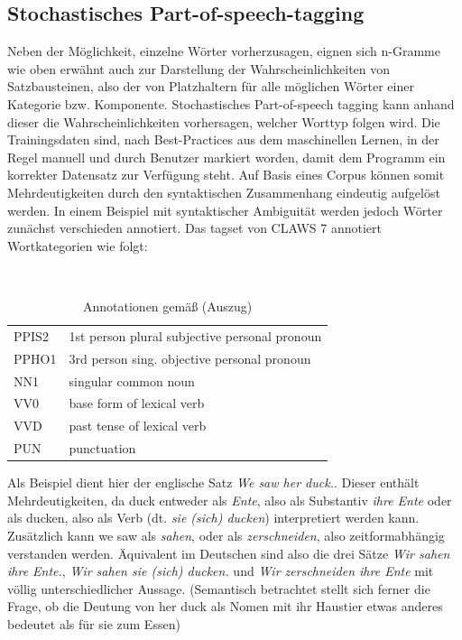 \documentclass[12pt]{report}
\begin{document}
\subsection{Stochastisches Part-of-speech-tagging}
Neben der Möglichkeit, einzelne Wörter vorherzusagen, eignen sich n-Gramme wie oben erwähnt auch zur Darstellung der Wahrscheinlichkeiten von Satzbausteinen, also der von Platzhaltern für alle möglichen Wörter einer Kategorie bzw. Komponente. Stochastisches Part-of-speech tagging kann anhand dieser die Wahrscheinlichkeiten vorhersagen, welcher Worttyp folgen wird. Die Trainingsdaten sind, nach Best-Practices aus dem maschinellen Lernen, in der Regel manuell und durch Benutzer markiert worden, damit dem Programm ein korrekter Datensatz zur Verfügung steht. Auf Basis eines Corpus können somit Mehrdeutigkeiten durch den syntaktischen Zusammenhang eindeutig aufgelöst werden. In einem Beispiel mit syntaktischer Ambiguität werden jedoch Wörter zunächst verschieden annotiert.
Das tagset von CLAWS 7 annotiert Wortkategorien wie folgt:

\begin{table}[h!]
\tt
\begin{tabular}{ll}
PPIS2	& 1st person plural subjective personal pronoun \\
PPHO1	& 3rd person sing. objective personal pronoun\\
NN1		& singular common noun \\
VV0		& base form of lexical verb \\
VVD		& past tense of lexical verb \\
PUN		& punctuation
\end{tabular}
\caption{Annotationen gemäß \cite{clw7} (Auszug)}
\end{table} 

\rm

Als Beispiel dient hier der englische Satz \textit{\glqq  We saw her duck.\grqq{}}. Dieser enthält Mehrdeutigkeiten, da \glqq  duck\grqq{} entweder als \textit{\glqq  Ente\grqq{}}, also als Substantiv \textit{\glqq  ihre Ente\grqq{}} oder als \glqq  ducken\grqq{}, also als Verb (dt. \textit{\glqq  sie (sich) ducken\grqq{}}) interpretiert werden kann. Zusätzlich kann \glqq  we saw\grqq{} als \textit{\glqq  sahen\grqq{}}, oder als \textit{\glqq  zerschneiden\grqq{}}, also zeitformabhängig verstanden werden. Äquivalent im Deutschen sind also die drei Sätze \textit{\glqq  Wir sahen ihre Ente.\grqq{}}, \textit{\glqq  Wir sahen sie (sich) ducken.\grqq{}} und \textit{\glqq  Wir zerschneiden ihre Ente\grqq{}} mit völlig unterschiedlicher Aussage. (Semantisch betrachtet stellt sich ferner die Frage, ob die Deutung von \glqq  her duck\grqq{} als Nomen mit \glqq  ihr Haustier\grqq{} etwas anderes bedeutet als \glqq  für sie zum Essen\grqq{})
\end{document}
